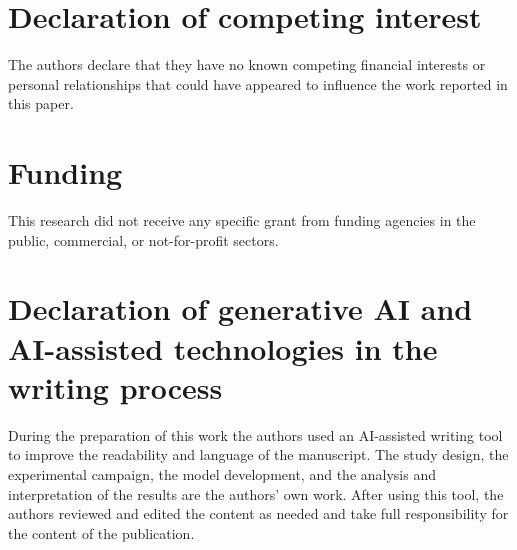 \documentclass[a4paper,fleqn]{cas-dc}
\begin{document}
\section*{Declaration of competing interest}
The authors declare that they have no known competing financial interests or
personal relationships that could have appeared to influence the work reported
in this paper.

\section*{Funding}
This research did not receive any specific grant from funding agencies in the
public, commercial, or not-for-profit sectors.

\section*{Declaration of generative AI and AI-assisted technologies in the writing process}
During the preparation of this work the authors used an AI-assisted writing tool
to improve the readability and language of the manuscript. The study design, the
experimental campaign, the model development, and the analysis and interpretation
of the results are the authors' own work. After using this tool, the authors
reviewed and edited the content as needed and take full responsibility for the
content of the publication.

\printcredits



\end{document}
